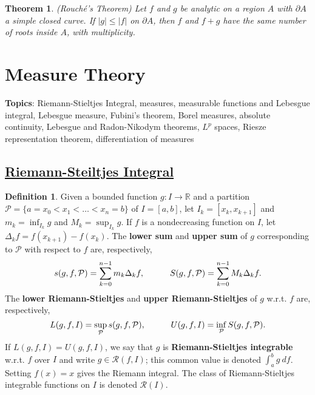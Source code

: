 \documentclass[11pt]{amsart}
\newtheorem*{theorem*}{Theorem}
\theoremstyle{definition}
\newtheorem*{definition*}{Definition}
\renewcommand\leq{\leqslant}
\renewcommand\:{\colon}
\newcommand{\calP}{\mathcal{P}}
\newcommand{\calR}{\mathcal{R}}
\newcommand{\R}{\mathds{R}}
\begin{document}
\begin{theorem*}
	\textnormal{(Rouch\'e's Theorem)} Let $f$ and $g$ be analytic on a region $A$ with $\partial A$ a simple closed curve. If $|g| \leq |f|$ on $\partial A$, then $f$ and $f + g$ have the same number of roots inside $A$, with multiplicity.
\end{theorem*}

\clearpage









\section{Measure Theory}

\noindent \textbf{Topics}: Riemann-Stieltjes Integral, measures, measurable functions and Lebesgue integral, Lebesgue measure, Fubini's theorem, Borel measures, absolute continuity, Lebesgue and Radon-Nikodym theorems, $L^p$ spaces, Riesze representation theorem, differentiation of measures
\vskip30pt



\subsection*{\underline{Riemann-Steiltjes Integral}}

\begin{definition*}
	Given a bounded function $g\: I \to \R$ and a partition $\calP = \{a = x_0 < x_1 < \dots < x_n = b\}$ of $I = [a, b]$, let $I_k = [x_k, x_{k+1}]$ and $m_k = \inf_{I_k} g$ and $M_k = \sup_{I_k} g$. If $f$ is a nondecreasing function on $I$, let $\Delta_k f = f(x_{k+1}) - f(x_k)$. The \textbf{lower sum} and \textbf{upper sum} of $g$ corresponding to $\calP$ with respect to $f$ are, respectively,
		\[ s(g,f,\calP) = \sum_{k = 0}^{n-1} m_k \Delta_k f, \hskip30pt S(g, f, \calP) = \sum_{k=0}^{n-1} M_k \Delta_k f. \]
	The \textbf{lower Riemann-Stieltjes} and \textbf{upper Riemann-Stieltjes} of $g$ w.r.t. $f$ are, respectively,
		\[ L(g, f, I) = \sup_\calP s(g, f, \calP), \hskip30pt U(g, f, I) = \inf_\calP S(g, f, \calP). \] 
	If $L(g, f, I) = U(g, f, I)$, we say that $g$ is \textbf{Riemann-Stieltjes integrable} w.r.t. $f$ over $I$ and write $g \in \calR(f, I)$; this common value is denoted $\int_a^b g \ df$. Setting $f(x) = x$ gives the Riemann integral. The class of Riemann-Stieltjes integrable functions on $I$ is denoted $\calR(I)$. 
\end{definition*}
\end{document}
